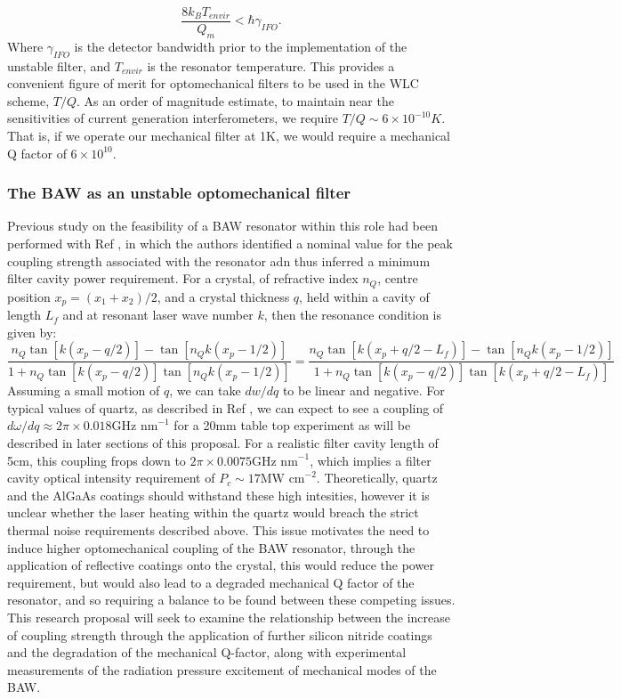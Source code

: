 \documentclass[aps,  
                a4paper, 
                amsmath, 
                amssymb, 
                preprint,
                tightenlines,  
                amsfonts,
                nofootinbib,
                onecolumn,
                titlepage,
                10pt
            ]{revtex4-2}
\begin{document}
    \begin{equation}
        \label{eq:thermal-noise}
        \frac{8k_BT_{envir}}{Q_m}<\hbar\gamma_{IFO}.
    \end{equation}
    Where $\gamma_{IFO}$ is the detector bandwidth prior to the implementation of the unstable filter, and $T_{envir}$ is the resonator temperature. This provides a convenient figure of merit for optomechanical filters to be used in the WLC scheme, $T/Q$. As an order of magnitude estimate, to maintain near the sensitivities of current generation interferometers, we require $T/Q\sim6\times10^{-10}K$. That is, if we operate our mechanical filter at 1K, we would require a mechanical Q factor of $6\times10^{10}$. 

    \subsubsection*{The BAW as an unstable optomechanical filter}
    Previous study on the feasibility of a BAW resonator within this role had been performed with Ref \cite{page2021}, in which the authors identified a nominal value for the peak coupling strength associated with the resonator adn thus inferred a minimum filter cavity power requirement. For a crystal, of refractive index $n_Q$, centre position $x_p=(x_1+x_2)/2$, and a crystal thickness $q$, held within a cavity of length $L_f$ and at resonant laser wave number $k$, then the resonance condition is given by:
    \begin{equation}
        \label{eq:page-BAW-resonance-condition}
        \frac{n_Q\tan[k(x_p-q/2)]-\tan[n_Qk(x_p-1/2)]}{1+n_Q\tan[k(x_p-q/2)]\tan[n_Qk(x_p-1/2)]}=\frac{n_Q\tan[k(x_p+q/2-L_f)]-\tan[n_Qk(x_p-1/2)]}{1+n_Q\tan[k(x_p-q/2)]\tan[k(x_p+q/2-L_f)]}
    \end{equation}
    Assuming a small motion of $q$, we can take $dw/dq$ to be linear and negative. For typical values of quartz, as described in Ref \cite{page2021}, we can expect to see a coupling of $d\omega/dq\approx2\pi\times0.018\text{GHz nm}^{-1}$ for a 20mm table top experiment as will be described in later sections of this proposal. For a realistic filter cavity length of 5cm, this coupling frops down to $2\pi\times0.0075\text{GHz nm}^{-1}$, which implies a filter cavity optical intensity requirement of $P_c\sim17\text{MW cm}^{-2}$. Theoretically, quartz and the AlGaAs coatings should withstand these high intesities, however it is unclear whether the laser heating within the quartz would breach the strict thermal noise requirements described above. This issue motivates the need to induce higher optomechanical coupling of the BAW resonator, through the application of reflective coatings onto the crystal, this would reduce the power requirement, but would also lead to a degraded mechanical Q factor of the resonator, and so requiring a balance to be found between these competing issues. This research proposal will seek to examine the relationship between the increase of coupling strength through the application of further silicon nitride coatings and the degradation of the mechanical Q-factor, along with experimental measurements of the radiation pressure excitement of mechanical modes of the BAW.
\end{document}
